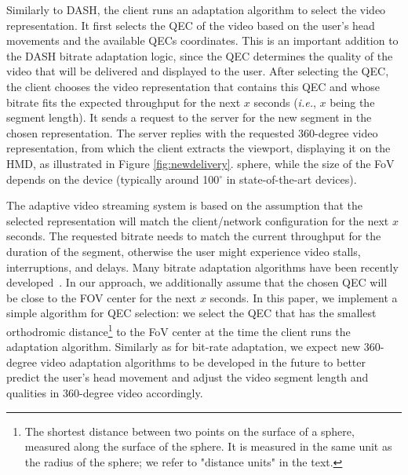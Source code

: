  Similarly to DASH, the client runs an
adaptation algorithm to select the video representation. It first
selects the QEC of the video based on the user's head movements and
the available QECs coordinates. This is an important addition to the
DASH bitrate adaptation logic, since the QEC determines the quality of
the video that will be delivered and displayed to the user. After
selecting the QEC, the client chooses the video representation that
contains this QEC and whose bitrate fits the expected throughput for
the next $x$ seconds (\textit{i.e.}, $x$ being the segment length). It
sends a request to the server for the new segment in the chosen
representation. The server replies with the requested 360-degree video
representation, from which the client extracts the viewport,
displaying it on the HMD, as illustrated in Figure
\ref{fig:newdelivery}. %
sphere, while the size of the FoV depends on the device (typically
around 100$^\circ$ in state-of-the-art devices).

The adaptive video streaming system is based on the assumption that
the selected representation will match the client/network
configuration for the next $x$ seconds. The requested bitrate needs to
match the current throughput for the duration of the segment,
otherwise the user might experience video stalls, interruptions, and
delays. Many bitrate adaptation algorithms have been recently
developed~\cite{tian,probe_li_2014,miller,zou,liu}. In our approach,
we additionally assume that the chosen QEC will be close to the FOV
center for the next $x$ seconds. In this paper, we implement a simple
algorithm for QEC selection: we select the QEC that has the smallest
orthodromic distance\footnote{The shortest distance between two points
on the surface of a sphere, measured along the surface of the sphere. It is measured in the same unit as the radius of the sphere; we refer to "distance units" in the text.}
to the FoV center at the time the client runs the adaptation
algorithm.
Similarly as for bit-rate adaptation, we expect new 360-degree video
adaptation algorithms to be developed in the future to better predict
the user's head movement and adjust the video segment length and
qualities in 360-degree video accordingly.


